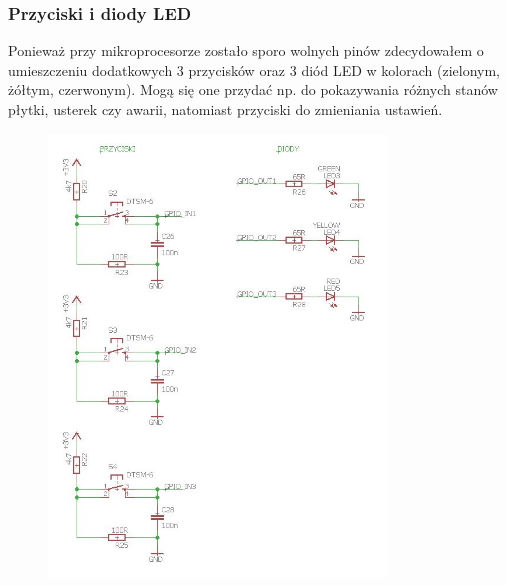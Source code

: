 \documentclass[12pt]{article}
\begin{document}
\subsubsection{Przyciski i diody LED}
Ponieważ przy mikroprocesorze zostało sporo wolnych pinów zdecydowałem o umieszczeniu dodatkowych 3 przycisków oraz 3 diód LED w kolorach (zielonym, żółtym, czerwonym). Mogą się one przydać np. do pokazywania różnych stanów płytki, usterek czy awarii, natomiast przyciski do zmieniania ustawień.
\begin{figure}[H]
\begin{center}
\includegraphics[width=0.8\textwidth]{figures/schemat8.jpg}
\end{center}
\end{figure}
\end{document}
